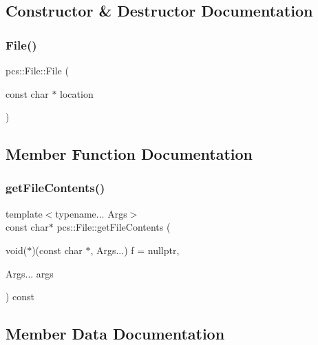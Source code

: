\subsection{Constructor \& Destructor Documentation}
\mbox{\label{classpcs_1_1File_a26d8a7d8ce42c0217b42845eee341c56}} 
\subsubsection{\texorpdfstring{File()}{File()}}
{\footnotesize\ttfamily pcs\+::\+File\+::\+File (\begin{DoxyParamCaption}\item[{const char $\ast$}]{location }\end{DoxyParamCaption})}



\subsection{Member Function Documentation}
\mbox{\label{classpcs_1_1File_a63b32c52dd5d6d3fa51a0178eae44ab4}} 
\subsubsection{\texorpdfstring{get\+File\+Contents()}{getFileContents()}}
{\footnotesize\ttfamily template$<$typename... Args$>$ \\
const char$\ast$ pcs\+::\+File\+::get\+File\+Contents (\begin{DoxyParamCaption}\item[{void($\ast$)(const char $\ast$, Args...)}]{f = {\ttfamily nullptr},  }\item[{Args...}]{args }\end{DoxyParamCaption}) const\hspace{0.3cm}{\ttfamily [inline]}}



\subsection{Member Data Documentation}
\mbox{\label{classpcs_1_1File_aba44c03eedf48cbe021f05680bfe6614}} 
